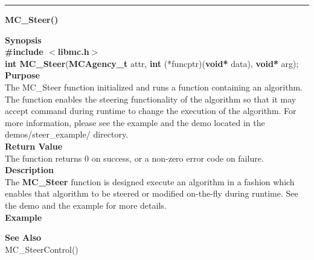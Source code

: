 \noindent
\vspace{5pt}
\rule{6.5in}{0.015in}
\noindent
{}
{\LARGE \bf MC\_Steer()}\\

\noindent
{\bf Synopsis}\\
{\bf \#include $<$libmc.h$>$}\\
{\bf int MC\_Steer}({\bf MCAgency\_t} attr, {\bf int} (*funcptr)({\bf void*} data), {\bf void*} arg);\\

\noindent
{\bf Purpose}\\
The MC\_Steer function initialized and runs a function containing an algorithm. 
The function enables the steering functionality of the algorithm so that it may accept 
command during runtime to change the execution of the algorithm. 
For more information, please see the example and the demo located in the 
demos/steer\_example/ directory.\\ 

\noindent
{\bf Return Value}\\
The function returns 0 on success, or a non-zero error code on failure. \\

\noindent
{\bf Description}\\
The {\bf MC\_Steer} function is designed execute an algorithm in a fashion which enables
that algorithm to be steered or modified on-the-fly during runtime. See the demo and
the example for more details. \\

\noindent
{\bf Example}\\
\noindent
{\footnotesize }

\noindent
{\bf See Also}\\
MC\_SteerControl()

